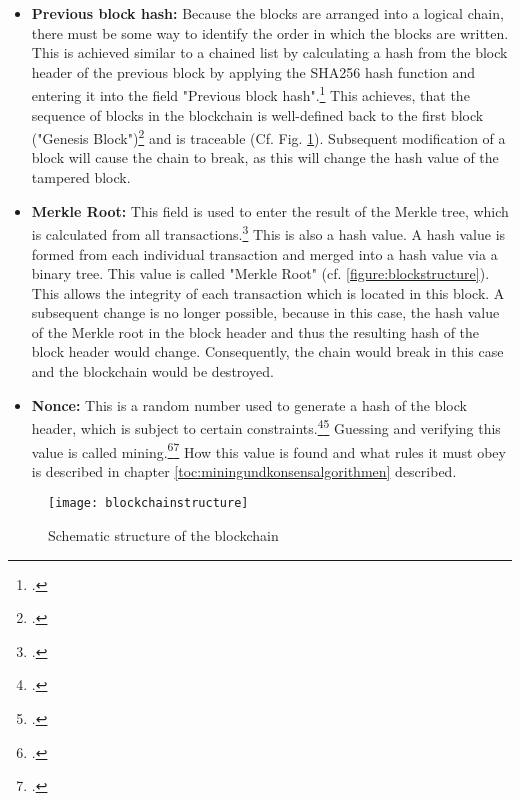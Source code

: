 \begin{itemize}
    \item \textbf{Previous block hash: }Because the blocks are arranged into a logical chain, there must be some way
    to identify the order in which the blocks are written. This is achieved similar to a
    chained list by calculating a hash from the block header of the previous block by applying the \ac{SHA}256
    hash function and entering it into the field "Previous block hash".\footcite[Cf.][p. 4]{nakamoto2008bitcoin} This achieves,
    that the sequence of blocks in the blockchain is well-defined back to the first block ("Genesis Block")\footcite[Cf.][Fig. 3.2]{bhaskar2015bitcoin}
    and is traceable (Cf. Fig. \ref{figure:blockchainstructure}).
    Subsequent modification of a block will cause the chain to break, as this will change the hash value of the
    tampered block.
    \item \textbf{Merkle Root: }This field is used to enter the result of the Merkle tree, which is calculated from all transactions.\footcite[Cf.][p. 4]{nakamoto2008bitcoin}
    This is also a hash value. A hash value is formed from
    each individual transaction and merged into a hash value via a binary tree. This value is called
    "Merkle Root" (cf. \ref{figure:blockstructure}). This allows the integrity of each transaction
    which is located in this block. A subsequent change is no longer possible, because in this case,
    the hash value of the Merkle root in the block header and thus the resulting hash of the block header would change.
    Consequently, the chain would break in this case and the blockchain would be destroyed.
    \item \textbf{Nonce: }This is a random number used to generate a hash of the block header,
    which is subject to certain constraints.\footcite[Cf.][p. 745]{mukhopadhyay2016brief}\footcite[Cf.][p. 136]{courtois2014optimizing}
    Guessing and verifying this value is called mining.\footcite[Cf.][pp. 50]{bhaskar2015bitcoin}\footcite[Cf.][p. 24]{han2019demystifying}
    How this value is found and what rules it must obey is described in chapter \ref{toc:miningundkonsensalgorithmen}
    described.
\end{itemize}

\begin{figure}[H]
    \caption{Schematic structure of the blockchain}
    \texttt{[image: blockchainstructure]}
    \label{figure:blockchainstructure}
    \\
    \cite[Source: Based on][p. 5]{nakamoto2008bitcoin}
\end{figure}

